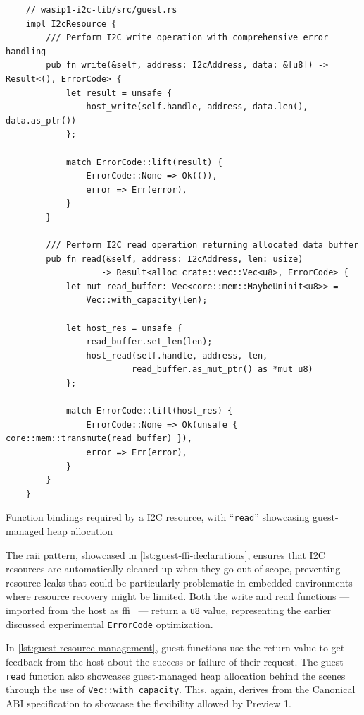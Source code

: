 \begin{listing}[H]
    \begin{verbatim}
    // wasip1-i2c-lib/src/guest.rs
    impl I2cResource {
        /// Perform I2C write operation with comprehensive error handling
        pub fn write(&self, address: I2cAddress, data: &[u8]) -> Result<(), ErrorCode> {
            let result = unsafe {
                host_write(self.handle, address, data.len(), data.as_ptr())
            };
            
            match ErrorCode::lift(result) {
                ErrorCode::None => Ok(()),
                error => Err(error),
            }
        }
    
        /// Perform I2C read operation returning allocated data buffer
        pub fn read(&self, address: I2cAddress, len: usize) 
                   -> Result<alloc_crate::vec::Vec<u8>, ErrorCode> {
            let mut read_buffer: Vec<core::mem::MaybeUninit<u8>> = 
                Vec::with_capacity(len);
    
            let host_res = unsafe {
                read_buffer.set_len(len);
                host_read(self.handle, address, len, 
                         read_buffer.as_mut_ptr() as *mut u8)
            };
    
            match ErrorCode::lift(host_res) {
                ErrorCode::None => Ok(unsafe { core::mem::transmute(read_buffer) }),
                error => Err(error),
            }
        }
    }
    \end{verbatim}
    \caption{Function bindings required by a I2C resource, with ``\texttt{read}'' showcasing guest-managed heap allocation}
    \label{lst:guest-resource-management}
\end{listing}

The \acrshort{raii} pattern, showcased in \autoref{lst:guest-ffi-declarations}, ensures that I2C resources are automatically cleaned up when they go out of scope, preventing resource leaks that could be particularly problematic in embedded environments where resource recovery might be limited. Both the write and read functions --- imported from the host as \acrfull{ffi}~\cite{ffi_wiki} --- return a \texttt{u8} value, representing the earlier discussed experimental \texttt{ErrorCode} optimization.

In \autoref{lst:guest-resource-management}, guest functions use the return value to get feedback from the host about the success or failure of their request. The guest \texttt{read} function also showcases guest-managed heap allocation behind the scenes through the use of \texttt{Vec::with\_capacity}. This, again, derives from the Canonical ABI specification to showcase the flexibility allowed by Preview 1.

